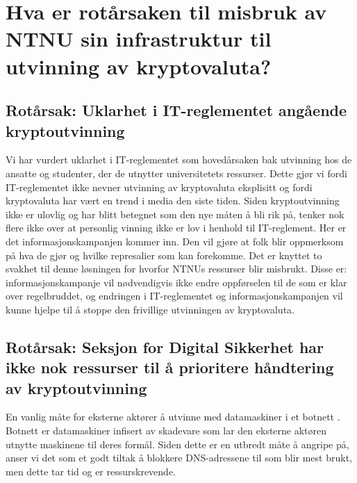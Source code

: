 \section{Hva er rotårsaken til misbruk av NTNU sin infrastruktur til utvinning av kryptovaluta?}
\subsection*{Rotårsak: Uklarhet i IT-reglementet angående kryptoutvinning}
Vi har vurdert uklarhet i IT-reglementet som hovedårsaken bak utvinning hos de ansatte og studenter, der de utnytter universitetets ressurser. Dette gjør vi fordi IT-reglementet ikke nevner utvinning av kryptovaluta eksplisitt og fordi kryptovaluta har vært en trend i media den siste tiden. Siden kryptoutvinning ikke er ulovlig og har blitt betegnet som den nye måten å bli rik på, tenker nok flere ikke over at personlig vinning ikke er lov i henhold til IT-reglement. Her er det informasjonskampanjen kommer inn. Den vil gjøre at folk blir oppmerksom på hva de gjør og hvilke represalier som kan forekomme. Det er knyttet to svakhet til denne løsningen for hvorfor NTNUs ressurser blir misbrukt. Disse er: informasjonskampanje vil nødvendigvis ikke endre oppførselen til de som er klar over regelbruddet, og endringen i IT-reglementet og informasjonskampanjen vil kunne hjelpe til å stoppe den frivillige utvinningen av kryptovaluta.


\subsection*{Rotårsak: Seksjon for Digital Sikkerhet har ikke nok ressurser til å prioritere håndtering av kryptoutvinning}
En vanlig måte for eksterne aktører å utvinne med datamaskiner i et botnett \cite{Botnet}. Botnett er datamaskiner infisert av skadevare som lar den eksterne aktøren utnytte maskinene til deres formål. Siden dette er en utbredt måte å angripe på, anser vi det som et godt tiltak å blokkere DNS-adressene til som blir mest brukt, men dette tar tid og er ressurskrevende.



